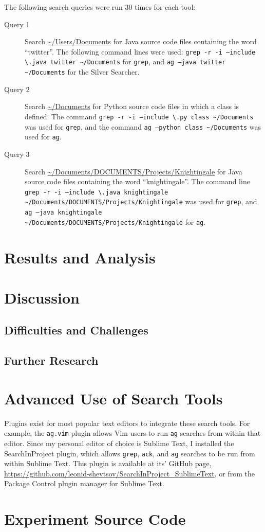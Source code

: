 \documentclass[12pt,letterpaper]{article}
\begin{document}
			The following search queries were run 30 times for each tool:
			\begin{description}
				\item[Query 1]{Search \url{~/Users/Documents} for Java source code files containing the word ``twitter''. The following command lines were used: \texttt{grep -r -i --include \textbackslash*.java twitter \textasciitilde/Documents} for \texttt{grep}, and \texttt{ag --java twitter \textasciitilde/Documents} for the Silver Searcher.}
				\item[Query 2]{Search \url{~/Documents} for Python source code files in which a class is defined. The command \texttt{grep -r -i --include \textbackslash*.py class \textasciitilde/Documents} was used for \texttt{grep}, and the command \texttt{ag --python class \textasciitilde/Documents} was used for \texttt{ag}.}
				\item[Query 3]{Search \url{~/Documents/DOCUMENTS/Projects/Knightingale} for Java source code files containing the word ``knightingale''. The command line \texttt{grep -r -i --include \textbackslash*.java knightingale \textasciitilde/Documents/DOCUMENTS/Projects/Knightingale} was used for \texttt{grep}, and \texttt{ag  --java knightingale \textasciitilde/Documents/DOCUMENTS/Projects/Knightingale} for \texttt{ag}.}
			\end{description}

	\section{Results and Analysis}
	\section{Discussion}
		\subsection{Difficulties and Challenges}
		\subsection{Further Research}
	\section{Advanced Use of Search Tools}

		Plugins exist for most popular text editors to integrate these search tools. For example, the \texttt{ag.vim} plugin allows Vim users to run \texttt{ag} searches from within that editor. Since my personal editor of choice is Sublime Text, I installed the SearchInProject plugin, which allows \texttt{grep}, \texttt{ack}, and \texttt{ag} searches to be run from within Sublime Text. This plugin is available at its' GitHub page, \url{https://github.com/leonid-shevtsov/SearchInProject_SublimeText}, or from the Package Control plugin manager for Sublime Text.
	\appendix
		\section{Experiment Source Code}
			
	\clearpage
	\printbibliography
\end{document}

